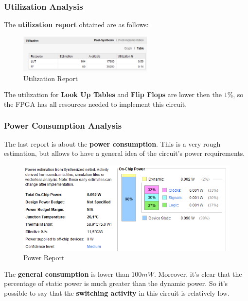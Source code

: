 \subsubsection{Utilization Analysis}

The \textbf{utilization report} obtained are as follows:

\begin{figure}[H]
    \centering
    \includegraphics[width=0.6\textwidth]{img/Chapter5/SyntesisUtilization.png}
    \caption{Utilization Report}
    \label{fig:SU}
\end{figure}

The utilization for \textbf{Look Up Tables} and \textbf{Flip Flops} are lower then the $1\%$, so the FPGA has all resources needed to implement this circuit.

\subsubsection{Power Consumption Analysis}

The last report is about the \textbf{power consumption}. This is a very rough estimation, but allows to have a general idea of the circuit's power requirements.

\begin{figure}[H]
    \centering
    \includegraphics[width=1\textwidth]{img/Chapter5/SyntesisPower.png}
    \caption{Power Report}
    \label{fig:SPR}
\end{figure}

The \textbf{general consumption} is lower than  $100mW$. Moreover, it's clear that the percentage of static power is much greater than the dynamic power. So it's possible to say that the \textbf{switching activity} in this circuit is relatively low.

